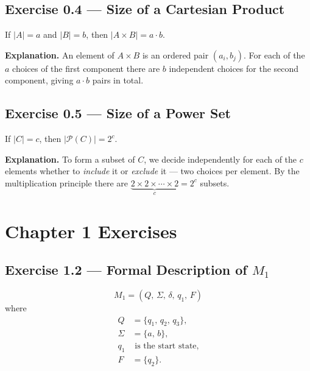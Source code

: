 \documentclass[12pt]{article}
\begin{document}
\subsection*{Exercise 0.4 --- Size of a Cartesian Product}

If $|A|=a$ and $|B|=b$, then $|A \times B| = a \cdot b$.

\medskip
\textbf{Explanation.} An element of $A\times B$ is an ordered pair $(a_i, b_j)$.
For each of the $a$ choices of the first component there are $b$ independent choices for
the second component, giving $a \cdot b$ pairs in total.

\subsection*{Exercise 0.5 --- Size of a Power Set}

If $|C| = c$, then $|\mathcal{P}(C)| = 2^c$.

\medskip
\textbf{Explanation.} To form a subset of $C$, we decide independently for each of the
$c$ elements whether to \emph{include} it or \emph{exclude} it --- two choices per element.
By the multiplication principle there are $\underbrace{2 \times 2 \times \cdots \times 2}_{c} = 2^c$ subsets.

\newpage
\section*{Chapter 1 Exercises}

\subsection*{Exercise 1.2 --- Formal Description of $M_1$}

\[
  M_1 = (Q,\,\Sigma,\,\delta,\,q_1,\,F)
\]
where
\begin{align*}
  Q      &= \{q_1,\, q_2,\, q_3\},\\
  \Sigma &= \{a,\, b\},\\
  q_1    &\text{ is the start state},\\
  F      &= \{q_2\}.
\end{align*}
\end{document}
